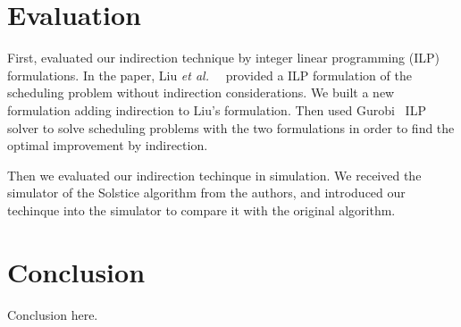 \section{Evaluation}
\label{sec:goal}
First, evaluated our indirection technique by integer
linear programming (ILP) formulations. In the paper, Liu \textit{et al.\ }~\cite{Liu:2015}
provided a ILP formulation of the scheduling problem without indirection
considerations. We built a new formulation adding indirection to Liu's formulation.
Then used Gurobi~\cite{gurobi}
ILP solver to solve scheduling problems with the two formulations in order
to find the optimal improvement by indirection.

Then we evaluated our indirection techinque in simulation. We received the
simulator of the Solstice algorithm from the authors, and introduced
our techinque into the simulator to compare it with the original algorithm.


\section{Conclusion}
\label{sec:conclu}

Conclusion here.